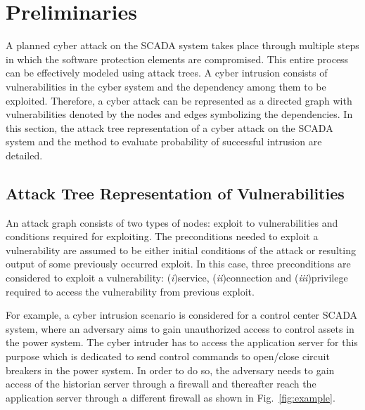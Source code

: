 \section{Preliminaries}\label{sec:prelim}
A planned cyber attack on the SCADA system takes place through multiple steps in which the software protection elements are compromised. This entire process can be effectively modeled using attack trees. A cyber intrusion consists of vulnerabilities in the cyber system and the dependency among them to be exploited. Therefore, a cyber attack can be represented as a directed graph with vulnerabilities denoted by the nodes and edges symbolizing the dependencies. In this section, the attack tree representation of a cyber attack on the SCADA system and the method to evaluate probability of successful intrusion are detailed.
\subsection{Attack Tree Representation of Vulnerabilities}
An attack graph consists of two types of nodes: exploit to vulnerabilities and conditions required for exploiting. The preconditions needed to exploit a vulnerability are assumed to be either initial conditions of the attack or resulting output of some previously occurred exploit. In this case, three preconditions are considered to exploit a vulnerability: (\textit{i})service, (\textit{ii})connection and (\textit{iii})privilege required to access the vulnerability from previous exploit.

For example, a cyber intrusion scenario is considered for a control center SCADA system, where an adversary aims to gain unauthorized access to control assets in the power system. The cyber intruder has to access the application server for this purpose which is dedicated to send control commands to open/close circuit breakers in the power system. In order to do so, the adversary needs to gain access of the historian server through a firewall and thereafter reach the application server through a different firewall as shown in Fig.~\ref{fig:example}.

